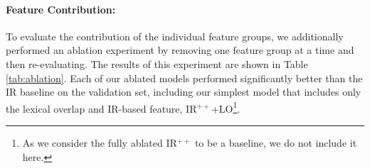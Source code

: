 \paragraph{Feature Contribution:} To evaluate the contribution of the individual feature groups, we additionally performed an ablation experiment by removing one feature group at a time and then re-evaluating.  The results of this experiment are shown in Table \ref{tab:ablation}.
Each of our ablated models performed significantly better than the IR baseline on the validation set, including our simplest model that includes only the lexical overlap and IR-based feature, IR$^{++}$+LO\footnote{As we consider the fully ablated IR$^{++}$ to be a baseline, we do not include it here.}.
   


